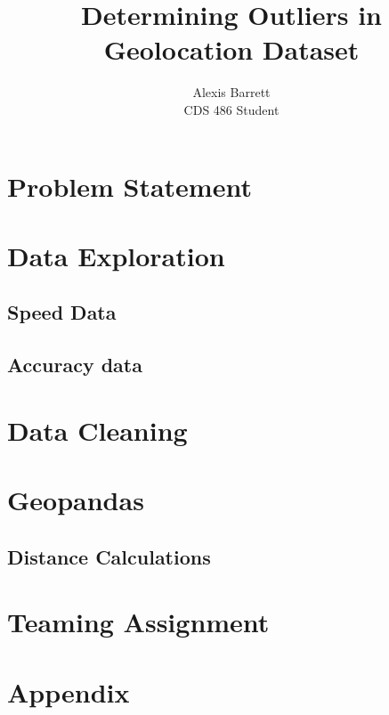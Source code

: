 \documentclass[12pt]{article}
\title{Determining Outliers in Geolocation Dataset}
\author{Alexis Barrett \\
	CDS 486 Student}
\begin{document}
\maketitle

\section{Problem Statement}

\section{Data Exploration}

\subsection{Speed Data}

\subsection{Accuracy data}

\section{Data Cleaning}

\section{Geopandas}

\subsection{Distance Calculations}

\section{Teaming Assignment}


\section{Appendix}
	\begin{lstlisting}
		
		
	\end{lstlisting}
\end{document}
